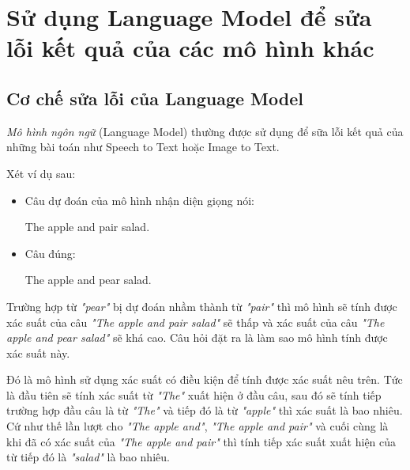 \section{Sử dụng Language Model để sửa lỗi kết quả của các mô hình khác}

\subsection{Cơ chế sửa lỗi của Language Model}
\textit{Mô hình ngôn ngữ} (Language Model) thường được sử dụng để sữa lỗi kết quả của những bài toán như Speech to Text hoặc Image to Text.

Xét ví dụ sau:
\begin{itemize}
    \item Câu dự đoán của mô hình nhận diện giọng nói:
    \begin{center}
    The apple and pair salad.
    \end{center}
    \item Câu đúng:
    \begin{center}
    The apple and pear salad.
    \end{center}
\end{itemize}

Trường hợp từ \textit{"pear"} bị dự đoán nhầm thành từ \textit{"pair"} thì mô hình sẽ tính được xác suất của câu \textit{"The apple and pair salad"} sẽ thấp và xác suất của câu \textit{"The apple and pear salad"} sẽ khá cao. Câu hỏi đặt ra là làm sao mô hình tính được xác suất này.

Đó là mô hình sử dụng xác suất có điều kiện để tính được xác suất nêu trên. Tức là đầu tiên sẽ tính xác suất từ \textit{"The"} xuất hiện ở đầu câu, sau đó sẽ tính tiếp trường hợp đầu câu là từ \textit{"The"} và tiếp đó là từ \textit{"apple"} thì xác suất là bao nhiêu. Cứ như thế lần lượt cho \textit{"The apple and"}, \textit{"The apple and pair"} và cuối cùng là khi đã có xác suất của \textit{"The apple and pair"} thì tính tiếp xác suất xuất hiện của từ tiếp đó là \textit{"salad"} là bao nhiêu.

